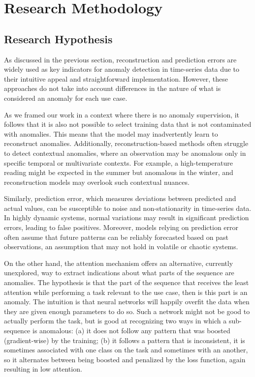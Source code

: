 \documentclass[runningheads]{llncs}
\begin{document}
\section{Research Methodology}
\label{sec:method}

\subsection{Research Hypothesis}
\label{sec:method:hypothesis}

As discussed in the previous section, reconstruction and prediction
errors are widely used as key indicators for anomaly detection in
time-series data due to their intuitive appeal and straightforward
implementation. However, these approaches do not take into account
differences in the nature of what is considered an anomaly for each
use case.

As we framed our work in a context where there is no anomaly
supervision, it follows that it is also not possible to select
training data that is not contaminated with anomalies. This means that
the model may inadvertently learn to reconstruct anomalies.
Additionally, reconstruction-based methods often struggle to detect
contextual anomalies, where an observation may be anomalous only in
specific temporal or multivariate contexts. For example, a
high-temperature reading might be expected in the summer but anomalous
in the winter, and reconstruction models may overlook such contextual
nuances.

Similarly, prediction error, which measures deviations between
predicted and actual values, can be susceptible to noise and
non-stationarity in time-series data. In highly dynamic systems,
normal variations may result in significant prediction errors, leading
to false positives. Moreover, models relying on prediction error often
assume that future patterns can be reliably forecasted based on past
observations, an assumption that may not hold in volatile or chaotic
systems.

On the other hand, the attention mechanism offers an alternative,
currently unexplored, way to extract indications about what parts of
the sequence are anomalies. The hypothesis is that the part of the
sequence that receives the least attention while performing a task
relevant to the use case, then is this part is an anomaly. The
intuition is that neural networks will happily overfit the data
when they are given enough parameters to do so. Such a network might
not be good to actually perform the task, but is good at recognizing
two ways in which a sub-sequence is anomalous: (a) it does not follow
any pattern that was boosted (gradient-wise) by the training;
(b) it follows a pattern that is inconsistent, it is sometimes
associated with one class on the task and sometimes with an another,
so it alternates between being boosted and penalized by the loss
function, again resulting in low attention.
\end{document}
